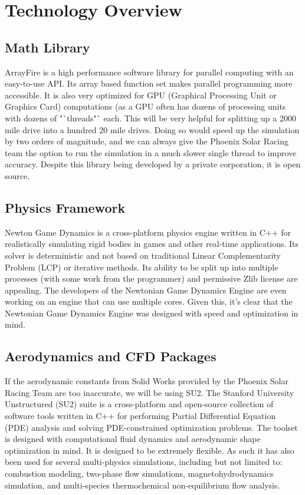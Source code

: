 \documentclass[onecolumn, draftclsnofoot,10pt, compsoc]{IEEEtran}
\begin{document}
\section{Technology Overview}
\subsection{Math Library}
ArrayFire is a high performance software library for parallel computing with an easy-to-use API.
Its array based function set makes parallel programming more accessible.
It is also very optimized for GPU (Graphical Processing Unit or Graphics Card) computations (as a GPU often has dozens of processing units with dozens of "`threads"` each.
This will be very helpful for splitting up a 2000 mile drive into a hundred 20 mile drives.
Doing so would speed up the simulation by two orders of magnitude, and we can always give the Phoenix Solar Racing team the option to run the simulation in a much slower single thread to improve accuracy.
Despite this library being developed by a private corporation, it is open source.
\cite{ArrayFire}

\subsection{Physics Framework}
Newton Game Dynamics is a cross-platform physics engine written in C++ for realistically simulating rigid bodies in games and other real-time applications.
Its solver is deterministic and not based on traditional Linear Complementarity Problem (LCP) or iterative methods.
Its ability to be split up into multiple processes (with some work from the programmer) and permissive Zlib license are appealing.
The developers of the Newtonian Game Dynamics Engine are even working on an engine that can use multiple cores.
Given this, it's clear that the Newtonian Game Dynamics Engine was designed with speed and optimization in mind.
\cite{NewtonGameDynamics}

\subsection{Aerodynamics and CFD Packages}
If the aerodynamic constants from Solid Works provided by the Phoenix Solar Racing Team are too inaccurate, we will be using SU2.
The Stanford University Unstructured (SU2) suite is a cross-platform and open-source collection of software tools written in C++ for performing Partial Differential Equation (PDE) analysis and solving PDE-constrained optimization problems.
The toolset is designed with computational fluid dynamics and aerodynamic shape optimization in mind.
It is designed to be extremely flexible.
As such it has also been used for several multi-physics simulations, including but not limited to: combustion modeling, two-phase flow simulations, magnetohydrodynamics simulation, and multi-species thermochemical non-equilibrium flow analysis.
\cite{SU2}
\end{document}
